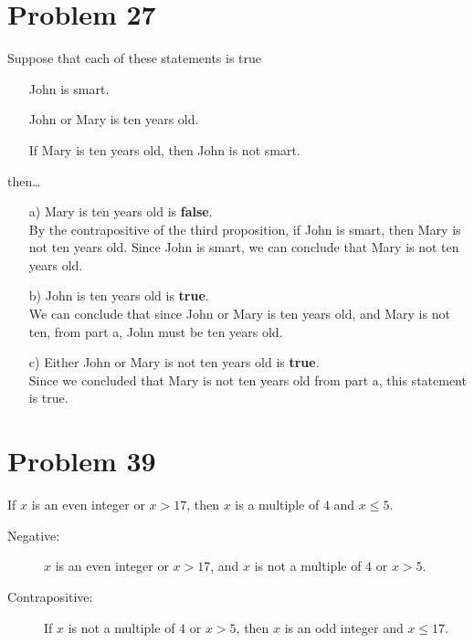 \documentclass{article}
\begin{document}
\section*{Problem 27}
Suppose that each of these statements is true
\begin{itemize}
\item[] John is smart.
\item[] John or Mary is ten years old.
\item[] If Mary is ten years old, then John is not smart.
\end{itemize}
then\ldots
\begin{enumerate}
\item[a)] Mary is ten years old is \textbf{false}.\\
By the contrapositive of the third proposition, if John is smart, then Mary is not ten years old. Since John is smart, we can conclude that Mary is not ten years old.

\item[b)] John is ten years old is \textbf{true}. \\
We can conclude that since John or Mary is ten years old, and Mary is not ten, from part a, John must be ten years old.

\item[c)] Either John or Mary is not ten years old is \textbf{true}.\\
Since we concluded that Mary is not ten years old from part a, this statement is true.
\end{enumerate}

\section*{Problem 39}
If $x$ is an even integer or $x > 17$, then $x$ is a multiple of $4$ and $x\leq5$.

\begin{description}
\item[Negative:] $x$ is an even integer or $x > 17$, and $x$ is not a multiple of $4$ or $x > 5$.
\item[Contrapositive:] If $x$ is not a multiple of $4$ or $x > 5$, then $x$ is an odd integer and $x \leq 17$.
\end{description}
\end{document}
